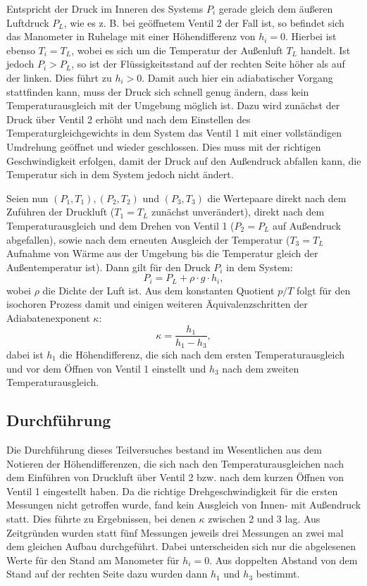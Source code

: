 			Entspricht der Druck im Inneren des Systems $P_i$ gerade gleich dem äußeren Luftdruck $P_L$, wie es z. B. bei geöffnetem Ventil 2 der Fall ist, so befindet sich das Manometer in Ruhelage mit einer Höhendifferenz von $h_i = 0$.
			Hierbei ist ebenso $T_i = T_L$, wobei es sich um die Temperatur der Außenluft $T_L$ handelt.
			Ist jedoch $P_i>P_L$, so ist der Flüssigkeitsstand auf der rechten Seite höher als auf der linken.
			Dies führt zu $h_i > 0$.
			Damit auch hier ein adiabatischer Vorgang stattfinden kann, muss der Druck sich schnell genug ändern, dass kein Temperaturausgleich mit der Umgebung möglich ist.
			Dazu wird zunächst der Druck über Ventil 2 erhöht und nach dem Einstellen des Temperaturgleichgewichts in dem System das Ventil 1 mit einer vollständigen Umdrehung geöffnet und wieder geschlossen.
			Dies muss mit der richtigen Geschwindigkeit erfolgen, damit der Druck auf den Außendruck abfallen kann, die Temperatur sich in dem System jedoch nicht ändert.
			
			Seien nun $(P_1,T_1),(P_2,T_2)$ und $(P_3,T_3)$ die Wertepaare direkt nach dem Zuführen der Druckluft (\textrightarrow $T_1 = T_L$ zunächst unverändert), direkt nach dem Temperaturausgleich und dem Drehen von Ventil 1 (\textrightarrow $P_2 = P_L$ auf Außendruck abgefallen), sowie nach dem erneuten Ausgleich der Temperatur (\textrightarrow $T_3 = T_L$ Aufnahme von Wärme aus der Umgebung bis die Temperatur gleich der Außentemperatur ist).
			Dann gilt für den Druck $P_i$ in dem System:
			\begin{equation}
				P_i = P_L + \rho\cdot g\cdot h_i,
			\end{equation} 
			wobei $\rho$ die Dichte der Luft ist.
			Aus dem konstanten Quotient $p/T$ folgt für den isochoren Prozess damit und einigen weiteren Äquivalenzschritten der Adiabatenexponent $\kappa$:
			\begin{equation} \label{eq:kappav2}
				\kappa = \frac{h_1}{h_1-h_3},
			\end{equation}
			dabei ist $h_1$ die Höhendifferenz, die sich nach dem ersten Temperaturausgleich und vor dem Öffnen von Ventil 1 einstellt und $h_3$ nach dem zweiten Temperaturausgleich.
			
	\subsection{Durchführung}
		
		Die Durchführung dieses Teilversuches bestand im Wesentlichen aus dem Notieren der Höhendifferenzen, die sich nach den Temperaturausgleichen nach dem Einführen von Druckluft über Ventil 2 bzw. nach dem kurzen Öffnen von Ventil 1 eingestellt haben.
		Da die richtige Drehgeschwindigkeit für die ersten Messungen nicht getroffen wurde, fand kein Ausgleich von Innen- mit Außendruck statt.
		Dies führte zu Ergebnissen, bei denen $\kappa$ zwischen 2 und 3 lag.
		Aus Zeitgründen wurden statt fünf Messungen jeweils drei Messungen an zwei mal dem gleichen Aufbau durchgeführt.
		Dabei unterscheiden sich nur die abgelesenen Werte für den Stand am Manometer für $h_i = 0$.
		Aus doppelten Abstand von dem Stand auf der rechten Seite dazu wurden dann $h_1$ und $h_3$ bestimmt.
		 

